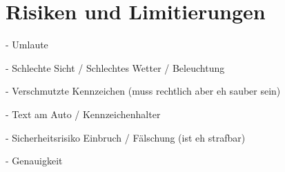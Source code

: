 \chapter{Risiken und Limitierungen}

- Umlaute

- Schlechte Sicht / Schlechtes Wetter / Beleuchtung

- Verschmutzte Kennzeichen (muss rechtlich aber eh sauber sein)

- Text am Auto / Kennzeichenhalter

- Sicherheitsrisiko Einbruch  / Fälschung (ist eh strafbar)

- Genauigkeit